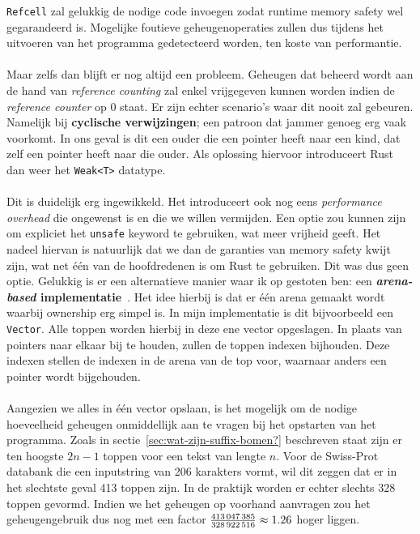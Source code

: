 \texttt{Refcell} zal gelukkig de nodige code invoegen zodat runtime memory safety wel gegarandeerd is.
Mogelijke foutieve geheugenoperaties zullen dus tijdens het uitvoeren van het programma gedetecteerd worden, ten koste van performantie.
\\ \\
Maar zelfs dan blijft er nog altijd een probleem.
Geheugen dat beheerd wordt aan de hand van \textit{reference counting} zal enkel vrijgegeven kunnen worden indien de \textit{reference counter} op 0 staat.
Er zijn echter scenario's waar dit nooit zal gebeuren.
Namelijk bij \textbf{cyclische verwijzingen}; een patroon dat jammer genoeg erg vaak voorkomt.
In ons geval is dit een ouder die een pointer heeft naar een kind, dat zelf een pointer heeft naar die ouder.
Als oplossing hiervoor introduceert Rust dan weer het \texttt{Weak<T>} datatype.
\\ \\
Dit is duidelijk erg ingewikkeld.
Het introduceert ook nog eens \textit{performance overhead} die ongewenst is en die we willen vermijden.
Een optie zou kunnen zijn om expliciet het \texttt{unsafe} keyword te gebruiken, wat meer vrijheid geeft.
Het nadeel hiervan is natuurlijk dat we dan de garanties van memory safety kwijt zijn, wat net één van de hoofdredenen is om Rust te gebruiken.
Dit was dus geen optie.
Gelukkig is er een alternatieve manier waar ik op gestoten ben: een \textbf{\textit{arena-based} implementatie}~\cite{rust_arena_trees}.
Het idee hierbij is dat er één arena gemaakt wordt waarbij ownership erg simpel is.
In mijn implementatie is dit bijvoorbeeld een \texttt{Vector}.
Alle toppen worden hierbij in deze ene vector opgeslagen.
In plaats van pointers naar elkaar bij te houden, zullen de toppen indexen bijhouden.
Deze indexen stellen de indexen in de arena van de top voor, waarnaar anders een pointer wordt bijgehouden.
\\ \\
Aangezien we alles in één vector opslaan, is het mogelijk om de nodige hoeveelheid geheugen onmiddellijk aan te vragen bij het opstarten van het programma.
Zoals in sectie~\ref{sec:wat-zijn-suffix-bomen?} beschreven staat zijn er ten hoogste $2n - 1$ toppen voor een tekst van lengte $n$.
Voor de Swiss-Prot databank die een inputstring van 206 karakters vormt, wil dit zeggen dat er in het slechtste geval 413 toppen zijn.
In de praktijk worden er echter slechts 328 toppen gevormd.
Indien we het geheugen op voorhand aanvragen zou het geheugengebruik dus nog met een factor $\frac{413\thinspace047\thinspace385}{328\thinspace922\thinspace516} \approx 1.26$ hoger liggen.
